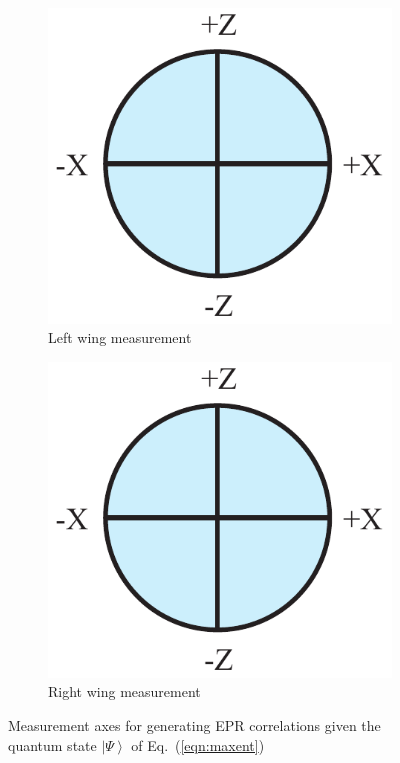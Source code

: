 \documentclass[12pt,onecolumn,nofootinbib]{revtex4-2}
\begin{document}
\begin{figure}[h]
	        \begin{subfigure}[b]{0.18\textwidth}
                	\centering
                	\includegraphics[width=\textwidth]{alice}
		\caption{Left wing measurement}
		\label{fig:alice-epr}
	\end{subfigure}
	\hspace{8em}
        \begin{subfigure}[b]{0.18\textwidth}
                	\centering
                	\includegraphics[width=\textwidth]{bob-epr}
             	\caption{Right wing measurement}
                	\label{fig:bob-epr}
        \end{subfigure}
 \caption{Measurement axes for generating EPR correlations given the quantum state $\left\vert \Psi \right\rangle$ of Eq.~(\ref{eqn:maxent})}
\label{fig:epr-meas}
\end{figure}
\end{document}
